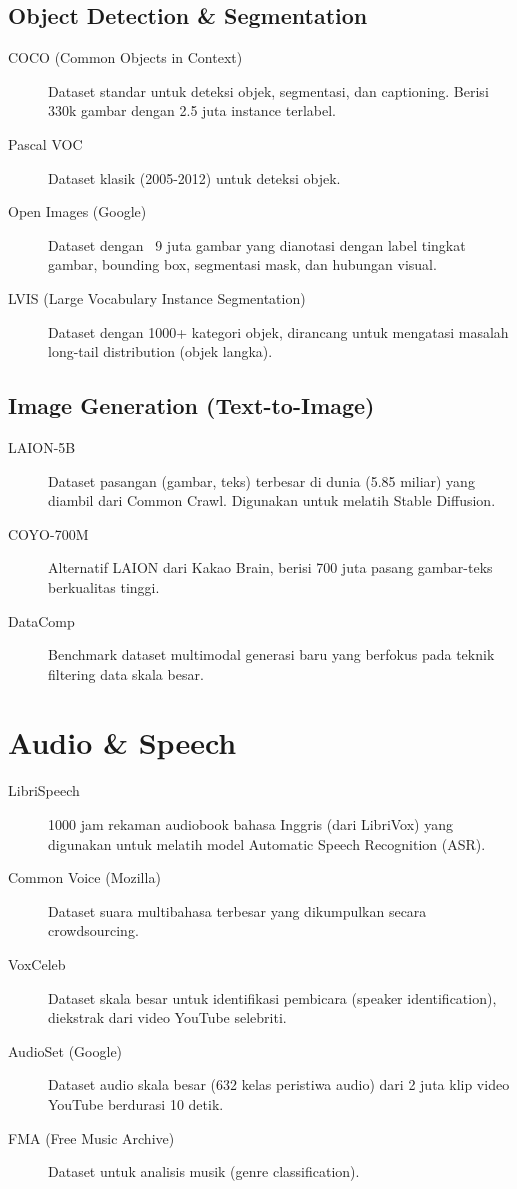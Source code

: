 \subsection{Object Detection \& Segmentation}
\begin{description}
    \item[COCO (Common Objects in Context)] Dataset standar untuk deteksi objek, segmentasi, dan captioning. Berisi 330k gambar dengan 2.5 juta instance terlabel.
    \item[Pascal VOC] Dataset klasik (2005-2012) untuk deteksi objek.
    \item[Open Images (Google)] Dataset dengan ~9 juta gambar yang dianotasi dengan label tingkat gambar, bounding box, segmentasi mask, dan hubungan visual.
    \item[LVIS (Large Vocabulary Instance Segmentation)] Dataset dengan 1000+ kategori objek, dirancang untuk mengatasi masalah long-tail distribution (objek langka).
\end{description}

\subsection{Image Generation (Text-to-Image)}
\begin{description}
    \item[LAION-5B] Dataset pasangan (gambar, teks) terbesar di dunia (5.85 miliar) yang diambil dari Common Crawl. Digunakan untuk melatih Stable Diffusion.
    \item[COYO-700M] Alternatif LAION dari Kakao Brain, berisi 700 juta pasang gambar-teks berkualitas tinggi.
    \item[DataComp] Benchmark dataset multimodal generasi baru yang berfokus pada teknik filtering data skala besar.
\end{description}

\section{Audio \& Speech}

\begin{description}
    \item[LibriSpeech] 1000 jam rekaman audiobook bahasa Inggris (dari LibriVox) yang digunakan untuk melatih model Automatic Speech Recognition (ASR).
    \item[Common Voice (Mozilla)] Dataset suara multibahasa terbesar yang dikumpulkan secara crowdsourcing.
    \item[VoxCeleb] Dataset skala besar untuk identifikasi pembicara (speaker identification), diekstrak dari video YouTube selebriti.
    \item[AudioSet (Google)] Dataset audio skala besar (632 kelas peristiwa audio) dari 2 juta klip video YouTube berdurasi 10 detik.
    \item[FMA (Free Music Archive)] Dataset untuk analisis musik (genre classification).
\end{description}

